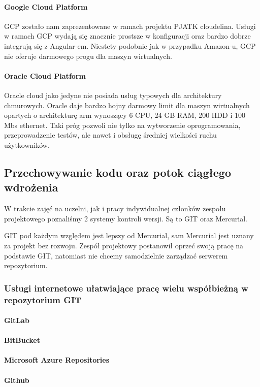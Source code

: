 \paragraph{Google Cloud Platform}
GCP zostało nam zaprezentowane w ramach projektu PJATK cloudelina.
Usługi w ramach GCP wydają się znacznie prostsze w konfiguracji oraz bardzo dobrze integrują się z Angular-em.
Niestety podobnie jak w przypadku Amazon-u, GCP nie oferuje darmowego progu dla maszyn wirtualnych.

\paragraph{Oracle Cloud Platform}
Oracle cloud jako jedyne nie posiada usług typowych dla architektury chmurowych.
Oracle daje bardzo hojny darmowy limit dla maszyn wirtualnych opartych o architekturę arm wynoszący 6 CPU, 24 GB RAM, 200 HDD i 100 Mbs ethernet.
Taki próg pozwoli nie tylko na wytworzenie oprogramowania, przeprowadzenie testów, ale nawet i obsługę średniej wielkości ruchu użytkowników.

\subsection{Przechowywanie kodu oraz potok ciągłego wdrożenia}
\label{subsec:przechowywanie-kodu-oraz-potok-ciagego-wdrozenia}

W trakcie zajęć na uczelni, jak i pracy indywidualnej członków zespołu projektowego poznaliśmy 2 systemy kontroli wersji.
Są to GIT oraz Mercurial.

GIT pod każdym względem jest lepszy od Mercurial, sam Mercurial jest uznany za projekt bez rozwoju.
Zespół projektowy postanowił oprzeć swoją pracę na podstawie GIT, natomiast nie chcemy samodzielnie zarządzać serwerem repozytorium.

\subsubsection{Usługi internetowe ułatwiające pracę wielu współbieżną w repozytorium GIT}
\paragraph{GitLab}
\paragraph{BitBucket}
\paragraph{Microsoft Azure Repositories}
\paragraph{Github}

